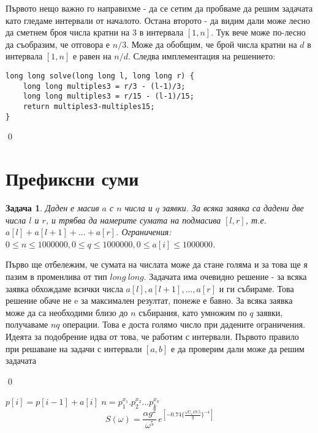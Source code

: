 \documentclass[]{article}
\newtheorem{problem}{Задача}
\newenvironment{solution}{\noindent{\bf Решение.}\hspace*{1em}}{\qed\par}
\begin{document}
\begin{solution}
Първото нещо важно го направихме - да се сетим да пробваме да решим задачата като гледаме интервали от началото. Остана второто - да видим дали може лесно да сметнем броя числа кратни на 3 в интервала $[1, n]$. Тук вече може по-лесно да съобразим, че отговора е $n/3$.\newline
Може да обобщим, че брой числа кратни на $d$ в интервала $[1, n]$ е равен на $n/d$.\newline
Следва имплементация на решението:
\begin{verbatim}
long long solve(long long l, long long r) {
	long long multiples3 = r/3 - (l-1)/3;
	long long multiples3 = r/15 - (l-1)/15;
	return multiples3-multiples15;
}
\end{verbatim}
\end{solution}

\section{Префиксни суми}

\begin{problem}
Даден е масив $a$ с $n$ числа и $q$ заявки. За всяка заявка са дадени две числа $l$ и $r$, и трябва да намерите сумата на подмасива $[l, r]$, т.е. $a[l]+a[l+1]+...+a[r]$.\newline
Ограничения: $0\leq n\leq 1000000,0\leq q\leq 1000000,0 \leq a[i]\leq 1000000$.
\end{problem}

\begin{solution}
Първо ще отбележим, че сумата на числата може да стане голяма и за това ще я пазим в променлива от тип $long\ long$.\newline
Задачата има очевидно решение - за всяка заявка обхождаме всички числа $a[l],a[l+1],...,a[r]$ и ги събираме. Това решение обаче не e за максимален резултат, понеже е бавно. За всяка заявка може да са необходими близо до $n$ събирания, като умножим по $q$ заявки, получаваме $nq$ операции. Това е доста голямо число при дадените ограничения.\newline
Идеята за подобрение идва от това, че работим с интервали. Първото правило при решаване на задачи с интервали $[a,b]$ е да проверим дали може да решим задачата


\end{solution}



$p[i]=p[i-1]+a[i]$
$n=p_1^{x_1}.p_2^{x_2}...p_k^{x_k}$
\begin{equation} 
S (\omega)=\frac{\alpha g^2}{\omega^5} \,
e ^{[-0.74\bigl\{\frac{\omega U_\omega 19.5}{g}\bigr\}^{-4}]}
\end{equation}
\end{document}
